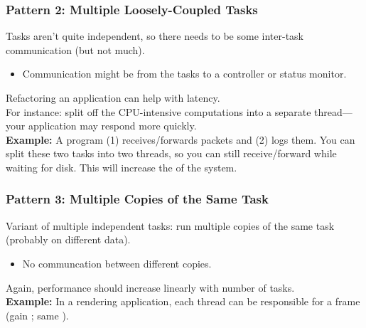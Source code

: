 \begin{frame}
  \frametitle{Pattern 2: Multiple Loosely-Coupled Tasks}

  
    Tasks aren't quite independent, so there needs to be some inter-task
      communication (but not much).
  \begin{itemize}

    \item Communication might be from the tasks to a controller or status
      monitor.
  \end{itemize}

    Refactoring an application can help with latency. \\
For instance: split off
      the CPU-intensive computations into a separate thread---your application may
      respond more quickly.\\[1em]
     {\bf Example:} A program (1) receives/forwards packets and (2) logs them. You
      can split these two tasks into two threads, so you can still
      receive/forward while waiting for disk. This will increase the
       of the system.
  
\end{frame}

\begin{frame}
  \frametitle{Pattern 3: Multiple Copies of the Same Task}

  
    Variant of multiple independent tasks: run multiple copies of the same task (probably on different data).

  \begin{itemize}
    \item No communcation between different copies.
  \end{itemize}

  Again, performance should increase linearly with number of tasks.\\[1em]

  {\bf Example:} In a rendering application, each thread can be
      responsible for a frame (gain ; same
      ).

  
\end{frame}

